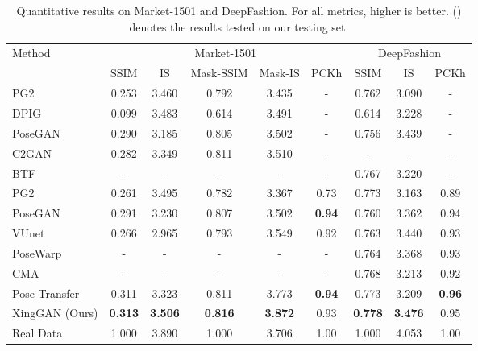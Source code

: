 \documentclass[runningheads]{llncs}
\begin{document}
\begin{table*}[!t]
	\centering
	\caption{Quantitative results on Market-1501 and DeepFashion. For all metrics, higher is better. () denotes the results tested on our testing set.}
		\begin{tabular}{lcccccccc} \toprule
			\multirow{2}{*}{Method}  & \multicolumn{5}{c}{Market-1501} & \multicolumn{3}{c}{DeepFashion} \\ \cmidrule(lr){2-6} \cmidrule(lr){7-9} 
			 & SSIM & IS   & Mask-SSIM & Mask-IS  & PCKh  & SSIM  & IS  & PCKh      \\ \hline	
			PG2~\cite{ma2017pose}                                        & 0.253 & 3.460 & 0.792 & 3.435   & - & 0.762 & 3.090  & - \\
			DPIG~\cite{ma2018disentangled}                           & 0.099 & 3.483 & 0.614 & 3.491   & - & 0.614 & 3.228    & - \\
			PoseGAN~\cite{siarohin2018deformable}              & 0.290 & 3.185 & 0.805 & 3.502   & - & 0.756 & 3.439    & -\\ 
			C2GAN~\cite{tang2019cycle}                                & 0.282 & 3.349 & 0.811 & 3.510   & - & -     & -            & -\\ 
			BTF~\cite{albahar2019guided}                               & -     & -     & -     & -       & - & 0.767 & 3.220                   & -\\ \hline
			PG2~\cite{ma2017pose}                             & 0.261 & 3.495 & 0.782 & 3.367   &0.73 & 0.773 & 3.163  & 0.89 \\ 
			PoseGAN~\cite{siarohin2018deformable}    & 0.291 & 3.230 & 0.807 & 3.502   & \textbf{0.94} & 0.760 & 3.362 & 0.94 \\ 
			VUnet~\cite{esser2018variational}              & 0.266 & 2.965 & 0.793 & 3.549   & 0.92 & 0.763 & 3.440 & 0.93 \\
			PoseWarp~\cite{balakrishnan2018synthesizing} &  - & - & - & - & - & 0.764 & 3.368 & 0.93 \\
			CMA~\cite{chi2019two} &  - & - & - & - & - & 0.768 & 3.213 & 0.92 \\
			Pose-Transfer~\cite{zhu2019progressive}  & 0.311 & 3.323 & 0.811 & 3.773   & \textbf{0.94} & 0.773 & 3.209 & \textbf{0.96} \\  
			XingGAN (Ours)                                                    & \textbf{0.313} & \textbf{3.506} & \textbf{0.816} & \textbf{3.872} & 0.93    &  \textbf{0.778} & \textbf{3.476}  & 0.95 \\ \hline	
			Real Data                                                               & 1.000 & 3.890 & 1.000 & 3.706   & 1.00 & 1.000 & 4.053 & 1.00 \\	
			\bottomrule	
	\end{tabular}
	\label{tab:pose_reuslts}
\end{table*}
\end{document}

